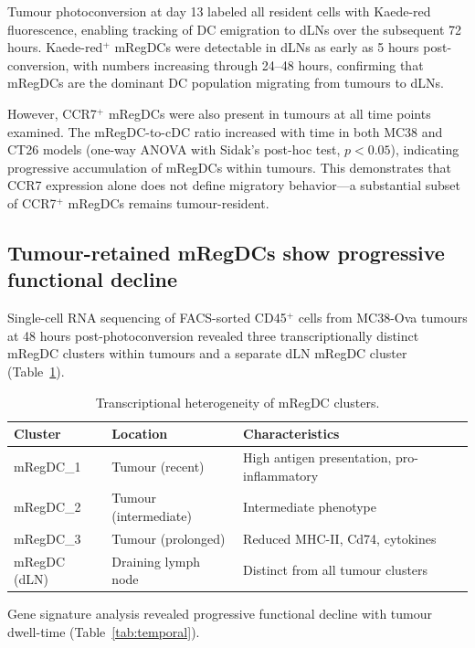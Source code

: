 \documentclass[11pt]{article}
\begin{document}
Tumour photoconversion at day 13 labeled all resident cells with Kaede-red fluorescence, enabling tracking of DC emigration to dLNs over the subsequent 72 hours. Kaede-red$^{+}$ mRegDCs were detectable in dLNs as early as 5 hours post-conversion, with numbers increasing through 24--48 hours, confirming that mRegDCs are the dominant DC population migrating from tumours to dLNs.

However, CCR7$^{+}$ mRegDCs were also present in tumours at all time points examined. The mRegDC-to-cDC ratio increased with time in both MC38 and CT26 models (one-way ANOVA with Sidak's post-hoc test, $p < 0.05$), indicating progressive accumulation of mRegDCs within tumours. This demonstrates that CCR7 expression alone does not define migratory behavior---a substantial subset of CCR7$^{+}$ mRegDCs remains tumour-resident.

\subsection{Tumour-retained mRegDCs show progressive functional decline}

Single-cell RNA sequencing of FACS-sorted CD45$^{+}$ cells from MC38-Ova tumours at 48 hours post-photoconversion revealed three transcriptionally distinct mRegDC clusters within tumours and a separate dLN mRegDC cluster (Table~\ref{tab:clusters}).

\begin{table}[ht]
\centering
\caption{Transcriptional heterogeneity of mRegDC clusters.}
\label{tab:clusters}
\begin{tabular}{lll}
\toprule
Cluster & Location & Characteristics \\
\midrule
mRegDC\_1 & Tumour (recent) & High antigen presentation, pro-inflammatory \\
mRegDC\_2 & Tumour (intermediate) & Intermediate phenotype \\
mRegDC\_3 & Tumour (prolonged) & Reduced MHC-II, Cd74, cytokines \\
mRegDC (dLN) & Draining lymph node & Distinct from all tumour clusters \\
\bottomrule
\end{tabular}
\end{table}

Gene signature analysis revealed progressive functional decline with tumour dwell-time (Table~\ref{tab:temporal}).
\end{document}

